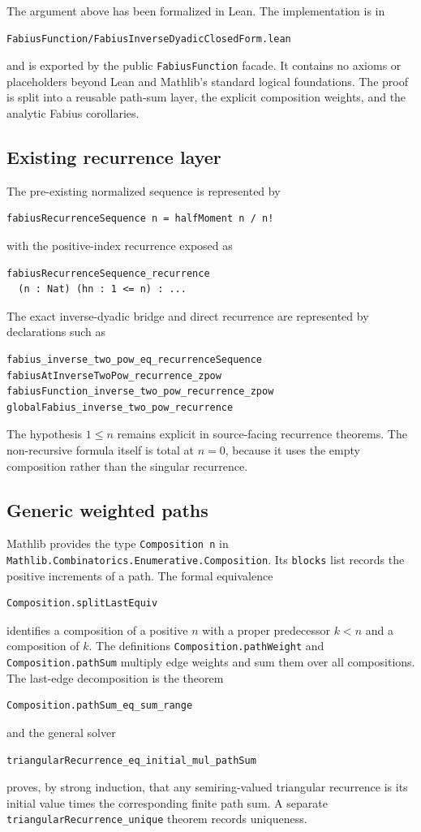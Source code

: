 \documentclass[11pt]{article}
\theoremstyle{definition}
\theoremstyle{remark}
\begin{document}
The argument above has been formalized in Lean.  The implementation is in
\begin{verbatim}
FabiusFunction/FabiusInverseDyadicClosedForm.lean
\end{verbatim}
and is exported by the public \verb|FabiusFunction| facade.  It contains no
axioms or placeholders beyond Lean and Mathlib's standard logical
foundations.  The proof is split into a reusable path-sum layer, the explicit
composition weights, and the analytic Fabius corollaries.

\subsection*{Existing recurrence layer}

The pre-existing normalized sequence is represented by
\begin{verbatim}
fabiusRecurrenceSequence n = halfMoment n / n!
\end{verbatim}
with the positive-index recurrence exposed as
\begin{verbatim}
fabiusRecurrenceSequence_recurrence
  (n : Nat) (hn : 1 <= n) : ...
\end{verbatim}
The exact inverse-dyadic bridge and direct recurrence are represented by
declarations such as
\begin{verbatim}
fabius_inverse_two_pow_eq_recurrenceSequence
fabiusAtInverseTwoPow_recurrence_zpow
fabiusFunction_inverse_two_pow_recurrence_zpow
globalFabius_inverse_two_pow_recurrence
\end{verbatim}
The hypothesis $1\leq n$ remains explicit in source-facing recurrence
theorems.  The non-recursive formula itself is total at $n=0$, because it
uses the empty composition rather than the singular recurrence.

\subsection*{Generic weighted paths}

Mathlib provides the type \verb|Composition n| in
\verb|Mathlib.Combinatorics.Enumerative.Composition|.  Its
\verb|blocks| list records the positive increments of a path.  The formal
equivalence
\begin{verbatim}
Composition.splitLastEquiv
\end{verbatim}
identifies a composition of a positive $n$ with a proper predecessor $k<n$
and a composition of $k$.  The definitions \verb|Composition.pathWeight|
and \verb|Composition.pathSum| multiply edge weights and sum them over all
compositions.  The last-edge decomposition is the theorem
\begin{verbatim}
Composition.pathSum_eq_sum_range
\end{verbatim}
and the general solver
\begin{verbatim}
triangularRecurrence_eq_initial_mul_pathSum
\end{verbatim}
proves, by strong induction, that any semiring-valued triangular recurrence
is its initial value times the corresponding finite path sum.  A separate
\verb|triangularRecurrence_unique| theorem records uniqueness.
\end{document}
